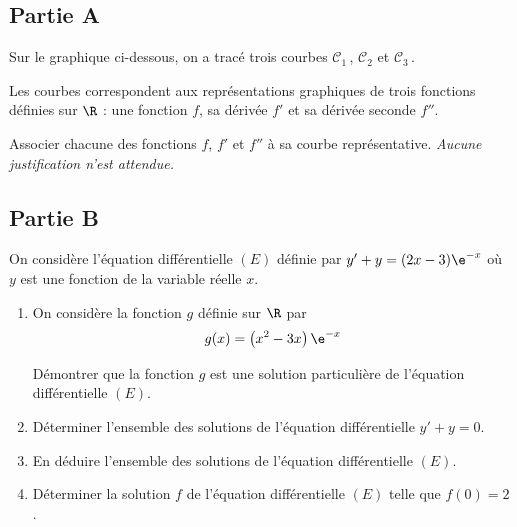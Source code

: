 \subsection*{Partie A}
Sur le graphique ci-dessous, on a tracé trois courbes $\mathcal{C}_{1}$\,, $\mathcal{C}_{2}$ et $\mathcal{C}_{3}$\,.

Les courbes correspondent aux représentations graphiques de trois fonctions définies sur $\R$ : une fonction $f$, sa dérivée $f'$ et sa dérivée seconde $f''$.

\begin{center}
\end{center}

Associer chacune des fonctions $f$, $f'$ et $f''$ à sa courbe représentative. \emph{Aucune justification n'est attendue.}


\subsection*{Partie B}
On considère l'équation différentielle $(E)$ définie par $y'+y=(2 x-3) \e^{-x}$ où $y$ est une fonction de la variable réelle $x$.

\begin{enumerate}
	\item On considère la fonction $g$ définie sur $\R$ par
	\[g(x)=\left(x^{2}-3 x\right) \e^{-x}\]

	Démontrer que la fonction $g$ est une solution particulière de l'équation différentielle $(E)$.

	\item Déterminer l'ensemble des solutions de l'équation différentielle \quad $y'+y=0$.

	\item En déduire l'ensemble des solutions de l'équation différentielle $(E)$.

	\item Déterminer la solution $f$ de l'équation différentielle $(E)$ telle que \quad $f(0)=2$.
\end{enumerate}

